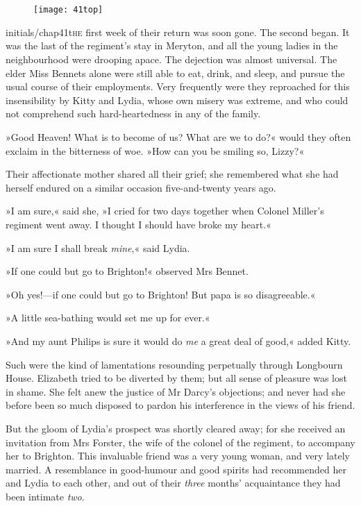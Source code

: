 \chapter[Chapter \thechapter]{}
	
	
\begin{figure}[t!]
\centering
\texttt{[image: 41top]}
\end{figure}


\lettrine[lines=6,image=true]{initials/chap41t}{he}  first week of their return was soon gone. The second began. It was the last of the regiment's stay in Meryton, and all the young ladies in the neighbourhood were drooping apace. The dejection was almost universal. The elder Miss Bennets alone were still able to eat, drink, and sleep, and pursue the usual course of their employments. Very frequently were they reproached for this insensibility by Kitty and Lydia, whose own misery was extreme, and who could not comprehend such hard-heartedness in any of the family.

»Good Heaven! What is to become of us? What are we to do?« would they often exclaim in the bitterness of woe. »How can you be smiling so, Lizzy?«

Their affectionate mother shared all their grief; she remembered what she had herself endured on a similar occasion five-and-twenty years ago.

»I am sure,« said she, »I cried for two days together when Colonel Miller's regiment went away. I thought I should have broke my heart.«

»I am sure I shall break \textit{mine},« said Lydia.

»If one could but go to Brighton!« observed Mrs Bennet.

»Oh yes!—if one could but go to Brighton! But papa is so disagreeable.«

»A little sea-bathing would set me up for ever.«

»And my aunt Philips is sure it would do \textit{me} a great deal of good,« added Kitty.

Such were the kind of lamentations resounding perpetually through Longbourn House. Elizabeth tried to be diverted by them; but all sense of pleasure was lost in shame. She felt anew the justice of Mr Darcy's objections; and never had she before been so much disposed to pardon his interference in the views of his friend.

But the gloom of Lydia's prospect was shortly cleared away; for she received an invitation from Mrs Forster, the wife of the colonel of the regiment, to accompany her to Brighton. This invaluable friend was a very young woman, and very lately married. A resemblance in good-humour and good spirits had recommended her and Lydia to each other, and out of their \textit{three} months' acquaintance they had been intimate \textit{two}.

